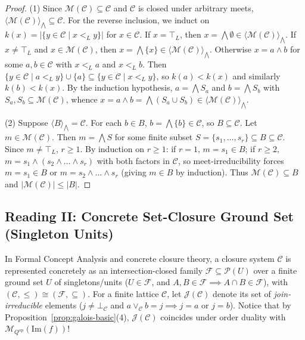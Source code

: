 \documentclass[11pt,a4paper]{article}
\theoremstyle{definition}
\theoremstyle{remark}
\begin{document}
\begin{proof}
(1) Since $\mathcal{M}(\mathcal{C}) \subseteq \mathcal{C}$ and $\mathcal{C}$ is closed under arbitrary meets, $\langle \mathcal{M}(\mathcal{C}) \rangle_{\bigwedge} \subseteq \mathcal{C}$. For the reverse inclusion, we induct on $k(x) = |\{ y \in \mathcal{C} \mid x <_L y \}|$ for $x \in \mathcal{C}$. If $x = \top_L$, then $x = \bigwedge \emptyset \in \langle \mathcal{M}(\mathcal{C}) \rangle_{\bigwedge}$. If $x \neq \top_L$ and $x \in \mathcal{M}(\mathcal{C})$, then $x = \bigwedge \{x\} \in \langle \mathcal{M}(\mathcal{C}) \rangle_{\bigwedge}$. Otherwise $x = a \wedge b$ for some $a, b \in \mathcal{C}$ with $x <_L a$ and $x <_L b$. Then $\{ y \in \mathcal{C} \mid a <_L y \} \cup \{a\} \subseteq \{ y \in \mathcal{C} \mid x <_L y \}$, so $k(a) < k(x)$ and similarly $k(b) < k(x)$. By the induction hypothesis, $a = \bigwedge S_a$ and $b = \bigwedge S_b$ with $S_a, S_b \subseteq \mathcal{M}(\mathcal{C})$, whence $x = a \wedge b = \bigwedge (S_a \cup S_b) \in \langle \mathcal{M}(\mathcal{C}) \rangle_{\bigwedge}$.

(2) Suppose $\langle B \rangle_{\bigwedge} = \mathcal{C}$. For each $b \in B$, $b = \bigwedge \{b\} \in \mathcal{C}$, so $B \subseteq \mathcal{C}$. Let $m \in \mathcal{M}(\mathcal{C})$. Then $m = \bigwedge S$ for some finite subset $S = \{s_1, \dots, s_r\} \subseteq B \subseteq \mathcal{C}$. Since $m \neq \top_L$, $r \ge 1$. By induction on $r \ge 1$: if $r = 1$, $m = s_1 \in B$; if $r \ge 2$, $m = s_1 \wedge (s_2 \wedge \dots \wedge s_r)$ with both factors in $\mathcal{C}$, so meet-irreducibility forces $m = s_1 \in B$ or $m = s_2 \wedge \dots \wedge s_r$ (giving $m \in B$ by induction). Thus $\mathcal{M}(\mathcal{C}) \subseteq B$ and $|\mathcal{M}(\mathcal{C})| \le |B|$.
\end{proof}

\subsection{Reading II: Concrete Set-Closure Ground Set (Singleton Units)}

In Formal Concept Analysis and concrete closure theory, a closure system $\mathcal{C}$ is represented concretely as an intersection-closed family $\mathcal{F} \subseteq \mathcal{P}(U)$ over a finite ground set $U$ of singletons/units ($U \in \mathcal{F}$, and $A, B \in \mathcal{F} \implies A \cap B \in \mathcal{F}$), with $(\mathcal{C}, \le) \cong (\mathcal{F}, \subseteq)$. For a finite lattice $\mathcal{C}$, let $\mathcal{J}(\mathcal{C})$ denote its set of \emph{join-irreducible} elements ($j \neq \bot_{\mathcal{C}}$ and $a \vee_{\mathcal{C}} b = j \implies j = a \text{ or } j = b$). Notice that by Proposition~\ref{prop:galois-basic}(4), $\mathcal{J}(\mathcal{C})$ coincides under order duality with $\mathcal{M}_{Q^{\mathrm{op}}}(\mathrm{Im}(f))$!
\end{document}
